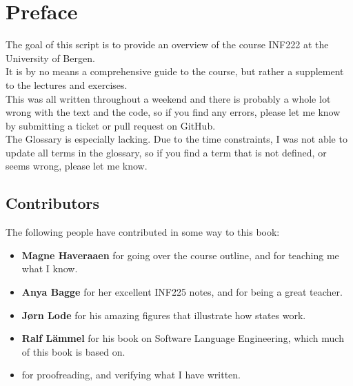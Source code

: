 \chapter*{Preface}
    The goal of this script is to provide an overview of the course INF222 at the University of Bergen.\\
    It is by no means a comprehensive guide to the course, but rather a supplement to the lectures and exercises.\\
    This was all written throughout a weekend and there is probably a whole lot wrong with the text and the code, so if you find any errors, please let me know by submitting a ticket or pull request on GitHub.\\
    The Glossary is especially lacking. Due to the time constraints, I was not able to update all terms in the glossary, so if you find a term that is not defined, or seems wrong, please let me know.\\
    
    \section*{Contributors}
    The following people have contributed in some way to this book:
    \begin{itemize}
        \item \textbf{Magne Haveraaen} for going over the course outline, and for teaching me what I know.
        \item \textbf{Anya Bagge} for her excellent INF225 notes, and for being a great teacher\cite{anya:2016}.
        \item \textbf{Jørn Lode} for his amazing figures that illustrate how states work.
        \item \textbf{Ralf Lämmel} for his book on Software Language Engineering, which much of this book is based on\cite{lammel:2018}.
        \item \textbf{} for proofreading, and verifying what I have written. 
    \end{itemize}

